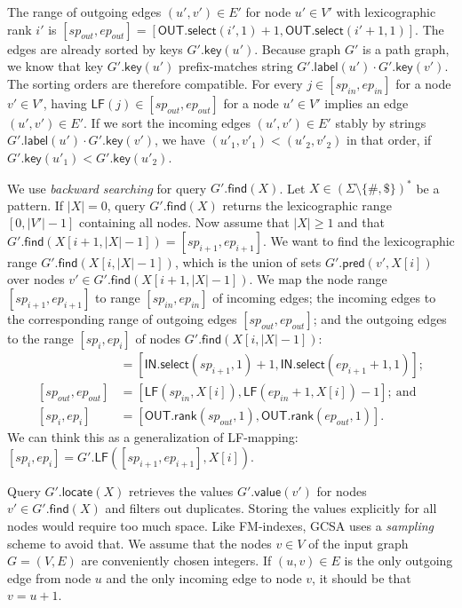 \documentclass[a4paper,UKenglish]{lipics-v2016}
\newcommand{\set}[1]{\ensuremath{\{ #1 \}}}
\newcommand{\abs}[1]{\ensuremath{\lvert #1 \rvert}}
\newcommand{\rank}{\ensuremath{\mathsf{rank}}}
\newcommand{\select}{\ensuremath{\mathsf{select}}}
\newcommand{\LF}{\ensuremath{\mathsf{LF}}}
\newcommand{\find}{\ensuremath{\mathsf{find}}}
\newcommand{\locate}{\ensuremath{\mathsf{locate}}}
\newcommand{\glabel}{\ensuremath{\mathsf{label}}}
\newcommand{\gpred}{\ensuremath{\mathsf{pred}}}
\newcommand{\gkey}{\ensuremath{\mathsf{key}}}
\newcommand{\gvalue}{\ensuremath{\mathsf{value}}}
\newcommand{\LFmapping}{LF\nobreakdash-mapping}
\newcommand{\patternset}{\ensuremath{(\Sigma \setminus \set{\#, \$})^{\ast}}}
\newcommand{\bvIN}{\ensuremath{\mathsf{IN}}}
\newcommand{\bvOUT}{\ensuremath{\mathsf{OUT}}}
\begin{document}
The range of outgoing edges $(u', v') \in E'$ for node $u' \in V'$ with lexicographic rank $i'$ is $[sp_{out}, ep_{out}] = [\bvOUT.\select(i', 1) + 1, \bvOUT.\select(i'+1, 1)]$. The edges are already sorted by keys $G'.\gkey(u')$. Because graph $G'$ is a path graph, we know that key $G'.\gkey(u')$ prefix-matches string $G'.\glabel(u') \cdot G'.\gkey(v')$. The sorting orders are therefore compatible. For every $j \in [sp_{in}, ep_{in}]$ for a node $v' \in V'$, having $\LF(j) \in [sp_{out}, ep_{out}]$ for a node $u' \in V'$ implies an edge $(u', v') \in E'$. If we sort the incoming edges $(u', v') \in E'$ stably by strings $G'.\glabel(u') \cdot G'.\gkey(v')$, we have $(u'_{1}, v'_{1}) < (u'_{2}, v'_{2})$ in that order, if $G'.\gkey(u'_{1}) < G'.\gkey(u'_{2})$.

We use \emph{backward searching} for query $G'.\find(X)$. Let $X \in \patternset$ be a pattern. If $\abs{X} = 0$, query $G'.\find(X)$ returns the lexicographic range $[0, \abs{V'}-1]$ containing all nodes. Now assume that $\abs{X} \ge 1$ and that $G'.\find(X[i+1, \abs{X}-1]) = [sp_{i+1}, ep_{i+1}]$. We want to find the lexicographic range $G'.\find(X[i, \abs{X}-1])$, which is the union of sets $G'.\gpred(v', X[i])$ over nodes $v' \in G'.\find(X[i+1, \abs{X}-1])$. We map the node range $[sp_{i+1}, ep_{i+1}]$ to range $[sp_{in}, ep_{in}]$ of incoming edges; the incoming edges to the corresponding range of outgoing edges $[sp_{out}, ep_{out}]$; and the outgoing edges to the range $[sp_{i}, ep_{i}]$ of nodes $G'.\find(X[i, \abs{X}-1])$:
\begin{align*}
[sp_{in}, ep_{in}] & = [\bvIN.\select(sp_{i+1}, 1) + 1, \bvIN.\select(ep_{i+1}+1, 1)]; \\
[sp_{out}, ep_{out}] & = [\LF(sp_{in}, X[i]), \LF(ep_{in}+1, X[i]) - 1];\ \textrm{and} \\
[sp_{i}, ep_{i}] & = [\bvOUT.\rank(sp_{out}, 1), \bvOUT.\rank(ep_{out}, 1)].
\end{align*}
We can think this as a generalization of \LFmapping: $[sp_{i}, ep_{i}] = G'.\LF([sp_{i+1}, ep_{i+1}], X[i])$.

Query $G'.\locate(X)$ retrieves the values $G'.\gvalue(v')$ for nodes $v' \in G'.\find(X)$ and filters out duplicates. Storing the values explicitly for all nodes would require too much space. Like FM\nobreakdash-indexes, GCSA uses a \emph{sampling} scheme to avoid that. We assume that the nodes $v \in V$ of the input graph $G = (V, E)$ are conveniently chosen integers. If $(u, v) \in E$ is the only outgoing edge from node $u$ and the only incoming edge to node $v$, it should be that $v = u+1$.
\end{document}
